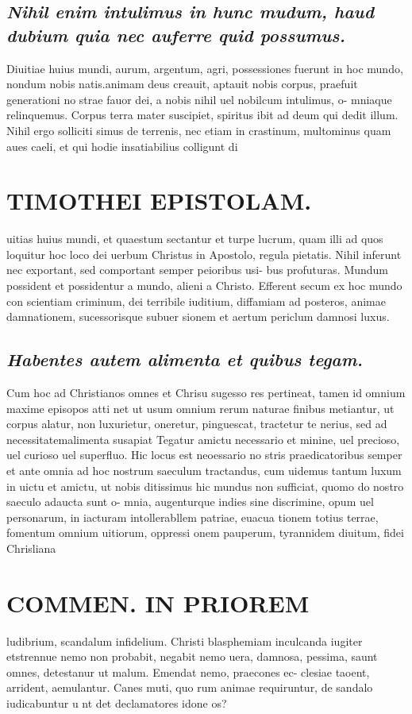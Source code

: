 \documentclass{article}
\begin{document}
\begin{pages}
\subsection*{\textit{Nihil enim intulimus in hunc mudum, haud dubium quia nec auferre quid possumus. }}\pstart Diuitiae huius mundi, aurum, argentum, agri, possessiones fuerunt in hoc mundo, nondum nobis natis.animam deus creauit, aptauit nobis corpus, praefuit generationi no strae fauor dei, a nobis nihil uel nobilcum intulimus, o- mniaque relinquemus. Corpus terra mater suscipiet, spiritus ibit ad deum qui dedit illum. Nihil ergo solliciti simus de terrenis, nec etiam in crastinum, multominus quam aues caeli, et qui hodie insatiabilius colligunt di  \pend
\section*{TIMOTHEI EPISTOLAM. }
\marginpar{[ p.163 ]}\pstart uitias huius mundi, et quaestum sectantur et turpe lucrum, quam illi ad quos loquitur hoc loco dei uerbum Christus in Apostolo, regula pietatis. Nihil inferunt nec exportant, sed comportant semper peioribus usi- bus profuturas. Mundum possident et possidentur a mundo, alieni a Christo. Efferent secum ex hoc mundo con scientiam criminum, dei terribile iuditium, diffamiam ad posteros, animae damnationem, sucessorisque subuer sionem et aertum periclum damnosi luxus.  \pend
{}
{}
\subsection*{\textit{Habentes autem alimenta et quibus tegam. }}\pstart Cum hoc ad Christianos omnes et Chrisu sugesso res pertineat, tamen id omnium maxime episopos atti net ut usum omnium rerum naturae finibus metiantur, ut corpus alatur, non luxurietur, oneretur, pinguescat, tractetur te nerius, sed ad necessitatemalimenta susapiat Tegatur amictu necessario et minine, uel precioso, uel curioso uel superfluo. Hic locus est neoessario no stris praedicatoribus semper et ante omnia ad hoc nostrum saeculum tractandus, cum uidemus tantum luxum in uictu et amictu, ut nobis ditissimus hic mundus non sufficiat, quomo do nostro saeculo adaucta sunt o- mnia, augenturque indies sine discrimine, opum uel personarum, in iacturam intollerabllem patriae, euacua tionem totius terrae, fomentum omnium uitiorum, oppressi onem pauperum, tyrannidem diuitum, fidei Chrisliana  \pend
\section*{COMMEN. IN PRIOREM }
\marginpar{[ p.164 ]}\pstart ludibrium, scandalum infidelium. Christi blasphemiam inculcanda iugiter etstrennue nemo non probabit, negabit nemo uera, damnosa, pessima, saunt omnes, detestanur ut malum. Emendat nemo, praecones ec- clesiae taoent, arrident, aemulantur. Canes muti, quo rum animae requiruntur, de sandalo iudicabuntur u nt det declamatores idone os?  \pend
{}
{}

\end{pages}
\end{document}
